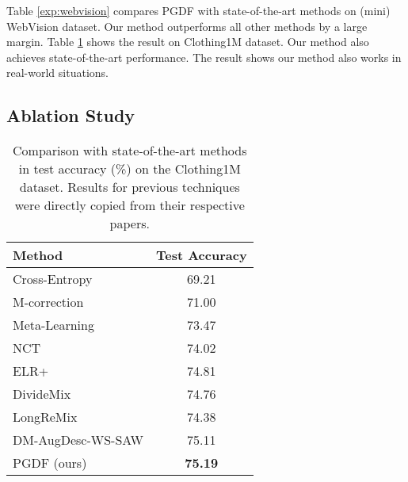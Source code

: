 \documentclass[letterpaper]{article} \usepackage{aaai22}  \usepackage{times}  \usepackage{helvet}  \usepackage{courier}  \usepackage[hyphens]{url}  \usepackage{graphicx} \urlstyle{rm} \def\UrlFont{\rm}  \usepackage{natbib}  \usepackage{caption} \DeclareCaptionStyle{ruled}{labelfont=normalfont,labelsep=colon,strut=off} \frenchspacing  \setlength{\pdfpagewidth}{8.5in}  \setlength{\pdfpageheight}{11in}  \usepackage{algorithm}
\begin{document}
{Table \ref{exp:webvision} compares PGDF with state-of-the-art methods on (mini) WebVision dataset. Our method outperforms all other methods by a large margin. Table \ref{exp:c1m} shows the result on Clothing1M dataset. Our method also achieves state-of-the-art performance. The result shows our method also works in real-world situations.}




\subsection{Ablation Study}
\label{Ablation}

\begin{table}[]
\caption{Comparison with state-of-the-art methods in test accuracy (\%) on the Clothing1M dataset. Results for previous techniques were directly copied from their respective papers.}
\vskip 0.15in
\scriptsize
\centering
\begin{tabular}{@{}lc@{}}
\toprule
\multicolumn{1}{l|}{Method}                  & Test Accuracy        \\ \midrule
\multicolumn{1}{l|}{Cross-Entropy}           & 69.21                \\
\multicolumn{1}{l|}{M-correction \cite{2019Unsupervised}}      & 71.00                \\
\multicolumn{1}{l|}{Meta-Learning \cite{2019Learning} }    & 73.47                \\
\multicolumn{1}{l|}{NCT \cite{2020Noisy} }    & 74.02                \\
\multicolumn{1}{l|}{ELR+ \cite{2020Early}}              & 74.81                \\
\multicolumn{1}{l|}{DivideMix \cite{2020DivideMix}}         & 74.76                \\
\multicolumn{1}{l|}{LongReMix \cite{2021LongReMix}}         & 74.38                \\
\multicolumn{1}{l|}{DM-AugDesc-WS-SAW \cite{2021Augmentation}} & 75.11                \\\midrule
\multicolumn{1}{l|}{PGDF (ours)}              & \textbf{75.19}       \\ \bottomrule
\end{tabular}
\label{exp:c1m}
\vskip -0.1in
\end{table}
\end{document}
